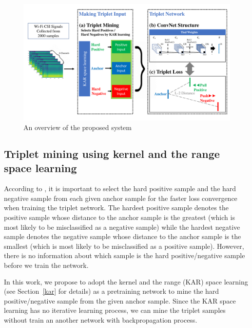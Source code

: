 \documentclass[runningheads]{llncs}
\begin{document}
\begin{figure}
    \includegraphics[width=\textwidth]{fig1_tcnn_kar_v3}
    \caption{An overview of the proposed system} \label{fig1}
\end{figure}

\subsection{Triplet mining using kernel and the range space learning}
According to \cite{schroff2015facenet}, it is important to select the hard positive sample and the hard negative sample from each given anchor sample for the faster loss convergence when training the triplet network.
The hardest positive sample denotes the positive sample whose distance to the anchor sample is the greatest (which is most likely to be misclassified as a negative sample) while the hardest negative sample denotes the negative sample whose distance to the anchor sample is the smallest (which is most likely to be misclassified as a positive sample). However, there is no information about which sample is the hard positive/negative sample before we train the network.

In this work, we propose to adopt the kernel and the range (KAR) space learning (see Section~\ref{kar} for details) as a pretraining network to mine the hard positive/negative sample from the given anchor sample. Since the KAR space learning has no iterative learning process, we can mine the triplet samples without train an another network with backpropagation process.
 
\end{document}

